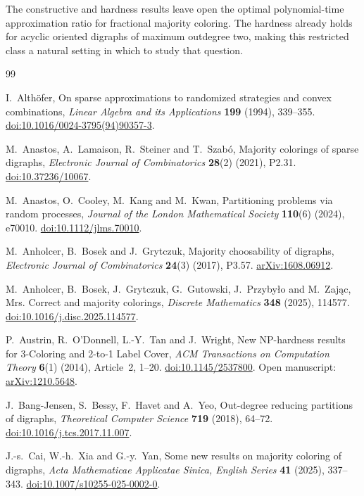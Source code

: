 \documentclass[12pt]{article}
\begin{document}
The constructive and hardness results leave open the optimal
polynomial-time approximation ratio for fractional majority
coloring. The hardness already holds for acyclic oriented digraphs
of maximum outdegree two, making this restricted class a natural
setting in which to study that question.

\begin{thebibliography}{99}
\small
\raggedright
{}
I.~Alth\"ofer,
On sparse approximations to randomized strategies and convex combinations,
\emph{Linear Algebra and its Applications} \textbf{199} (1994), 339--355.
\href{https://doi.org/10.1016/0024-3795(94)90357-3}{doi:10.1016/0024-3795(94)90357-3}.

M.~Anastos, A.~Lamaison, R.~Steiner and T.~Szab\'o,
Majority colorings of sparse digraphs,
\emph{Electronic Journal of Combinatorics} \textbf{28}(2) (2021), P2.31.
\href{https://doi.org/10.37236/10067}{doi:10.37236/10067}.

M.~Anastos, O.~Cooley, M.~Kang and M.~Kwan,
Partitioning problems via random processes,
\emph{Journal of the London Mathematical Society} \textbf{110}(6) (2024), e70010.
\href{https://doi.org/10.1112/jlms.70010}{doi:10.1112/jlms.70010}.

M.~Anholcer, B.~Bosek and J.~Grytczuk,
Majority choosability of digraphs,
\emph{Electronic Journal of Combinatorics} \textbf{24}(3) (2017), P3.57.
\href{https://arxiv.org/abs/1608.06912}{arXiv:1608.06912}.

M.~Anholcer, B.~Bosek, J.~Grytczuk, G.~Gutowski, J.~Przyby\l o and M.~Zaj\k ac,
Mrs. Correct and majority colorings,
\emph{Discrete Mathematics} \textbf{348} (2025), 114577.
\href{https://doi.org/10.1016/j.disc.2025.114577}{doi:10.1016/j.disc.2025.114577}.

P.~Austrin, R.~O'Donnell, L.-Y.~Tan and J.~Wright,
New NP-hardness results for 3-Coloring and 2-to-1 Label Cover,
\emph{ACM Transactions on Computation Theory} \textbf{6}(1) (2014), Article~2, 1--20.
\href{https://doi.org/10.1145/2537800}{doi:10.1145/2537800}.
Open manuscript: \href{https://arxiv.org/abs/1210.5648}{arXiv:1210.5648}.

J.~Bang-Jensen, S.~Bessy, F.~Havet and A.~Yeo,
Out-degree reducing partitions of digraphs,
\emph{Theoretical Computer Science} \textbf{719} (2018), 64--72.
\href{https://doi.org/10.1016/j.tcs.2017.11.007}{doi:10.1016/j.tcs.2017.11.007}.

J.-s.~Cai, W.-h.~Xia and G.-y.~Yan,
Some new results on majority coloring of digraphs,
\emph{Acta Mathematicae Applicatae Sinica, English Series}
\textbf{41} (2025), 337--343.
\href{https://doi.org/10.1007/s10255-025-0002-0}{doi:10.1007/s10255-025-0002-0}.


\end{thebibliography}
\end{document}
